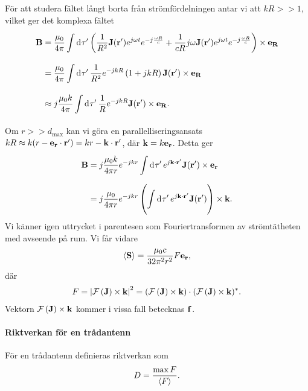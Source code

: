 För att studera fältet långt borta från strömfördelningen antar vi att $kR >> 1$, vilket ger det komplexa fältet
\begin{align*}
	\vb{B} &= \frac{\mu_{0}}{4\pi}\int\limits_{}^{}\dd[]{\tau'}\left(\frac{1}{R^{2}}\vb{J}(\vb{r}')e^{j\omega t}e^{-j\frac{\omega R}{c}} + \frac{1}{cR}j\omega\vb{J}(\vb{r}')e^{j\omega t}e^{-j\frac{\omega R}{c}}\right)\times\vb{e}_{\vb{R}} \\
	       &= \frac{\mu_{0}}{4\pi}\int\limits_{}^{}\dd[]{\tau'}\frac{1}{R^{2}}e^{-jkR}\left(1 + jkR\right)\vb{J}(\vb{r}')\times\vb{e}_{\vb{R}} \\
	       &\approx j\frac{\mu_{0}k}{4\pi}\int\limits_{}^{}\dd[]{\tau'}\frac{1}{R}e^{-jkR}\vb{J}(\vb{r}')\times\vb{e}_{\vb{R}}.
\end{align*}
Om $r >> d_{\text{max}}$ kan vi göra en parallelliseringsansats $kR \approx k(r - \vb{e}_{\vb{r}}\cdot\vb{r}') = kr - \vb{k}\cdot\vb{r}'$, där $\vb{k} = k\vb{e}_{\vb{r}}$. Detta ger
\begin{align*}
	\vb{B} &= j\frac{\mu_{0}k}{4\pi r}e^{-jkr}\int\limits_{}^{}\dd[]{\tau'}e^{j\vb{k}\cdot\vb{r}'}\vb{J}(\vb{r}')\times\vb{e}_{\vb{r}} \\
	       &= j\frac{\mu_{0}}{4\pi r}e^{-jkr}\left(\int\limits_{}^{}\dd[]{\tau'}e^{j\vb{k}\cdot\vb{r}'}\vb{J}(\vb{r}')\right)\times\vb{k}.
\end{align*}
Vi känner igen uttrycket i parentesen som Fouriertransformen av strömtätheten med avseende på rum. Vi får vidare
\begin{align*}
	\expval{\vb{S}} = \frac{\mu_{0}c}{32\pi^{2}r^{2}}F\vb{e}_{\vb{r}},
\end{align*}
där
\begin{align*}
	F = \abs{\mathcal{F}\left(\vb{J}\right)\times\vb{k}}^{2} = (\mathcal{F}\left(\vb{J}\right)\times\vb{k})\cdot(\mathcal{F}\left(\vb{J}\right)\times\vb{k})^{*}.
\end{align*}
Vektorn $\mathcal{F}\left(\vb{J}\right)\times\vb{k}$ kommer i vissa fall betecknas $\vb{f}$.

\paragraph{Riktverkan för en trådantenn}
För en trådantenn definieras riktverkan som
\begin{align*}
	D = \frac{\max{F}}{\expval{F}}.
\end{align*}